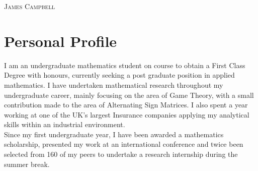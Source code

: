 \documentclass[a4paper]{article}
\begin{document}
\pagestyle{empty} %
\begin{multicols}{2}

\raggedright{\textsc{\Huge{James Campbell}}}\\
\columnbreak
{}

\end{multicols}

\section{Personal Profile}
I am an undergraduate mathematics student on course to obtain a First Class Degree with honours, currently seeking a post graduate position in applied mathematics.
I have undertaken mathematical research throughout my undergraduate career, mainly focusing on the area of Game Theory, with a small contribution made to the area of Alternating Sign Matrices.
I also spent a year working at one of the UK's largest Insurance companies applying my analytical skills within an industrial environment.
\\
Since my first undergraduate year, I have been awarded a mathematics scholarship, presented my work at an international conference and twice been selected from 160 of my peers to undertake a research internship during the summer break.

\end{document}

